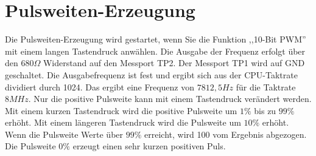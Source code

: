 \section{Pulsweiten-Erzeugung}
Die Pulsweiten-Erzeugung wird gestartet, wenn Sie die Funktion ,,10-Bit PWM'' mit einem
langen Tastendruck anwählen.
Die Ausgabe der Frequenz erfolgt über den \(680\Omega\) Widerstand auf den Messport TP2.
Der Messport TP1 wird auf GND geschaltet.
Die Ausgabefrequenz ist fest und ergibt sich aus der CPU-Taktrate dividiert durch 1024.
Das ergibt eine Frequenz von \(7812,5Hz\) für die Taktrate \(8MHz\).
Nur die positive Pulsweite kann mit einem Tastendruck verändert werden. Mit einem
kurzen Tastendruck wird die positive Pulsweite um \(1\%\) bis zu \(99\%\) erhöht.
Mit einem längeren Tastendruck wird die Pulsweite um \(10\%\) erhöht.
Wenn die Pulsweite Werte über \(99\%\) erreicht, wird 100 vom Ergebnis abgezogen.
Die Pulsweite \(0\%\) erzeugt einen sehr kurzen positiven Puls.

